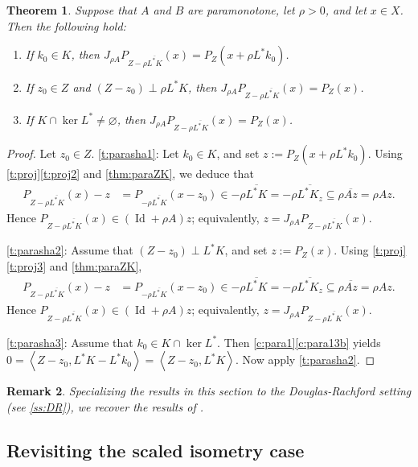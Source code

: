 \documentclass{article}
\newcommand{\scal}[2]{\left\langle{#1},{#2}  \right\rangle}
\newcommand{\Id}{\ensuremath{\operatorname{Id}}}
\newtheorem{theorem}{Theorem}[section]
\newtheorem{remark}[theorem]{Remark}
\newcommand{\cl}[1]{\overline{#1}}
\begin{document}
\begin{theorem}\label{t:parasha}
Suppose that $A$ and $B$ are paramonotone, 
let $\rho>0$, and let $x\in X$. 
Then the following hold:
\begin{enumerate}
\item
\label{t:parasha1} 
If $k_0\in K$, then 
$J_{\rho A}P_{Z-\rho \cl{L^*K}}(x)=P_Z(x+\rho L^*k_0)$. 
\item
\label{t:parasha2} 
If $z_0 \in Z$ and  $(Z-z_0)\perp \rho L^*K$, 
then 
$J_{\rho A} P_{Z-\rho \cl{L^*K}}(x)=P_Z(x)$. 
\item 
\label{t:parasha3}
If $K\cap \ker L^*\neq \varnothing$, then 
$J_{\rho A} P_{Z-\rho \cl{L^*K}}(x)=P_Z(x)$. 
\end{enumerate}
\end{theorem}

\begin{proof}
Let  $z_0\in Z$. 
\cref{t:parasha1}: 
Let $k_0\in K$, and 
set $z:=P_Z(x+\rho L^*k_0)$. 
Using \cref{t:proj}\cref{t:proj2} and \cref{thm:paraZK}, 
we deduce that 
\begin{align}
P_{Z-\rho \cl{L^*K}}(x)-z&=P_{-\rho\cl{L^*K}}(x-z_0)
\in -\rho \cl{L^*K}=-\rho\cl{L^*K_z} \subseteq \rho\cl{Az}=\rho Az.
\end{align}
Hence 
$P_{Z-\rho \cl{L^*K}}(x)\in (\Id+\rho A)z$; 
equivalently, 
$z = J_{\rho A}P_{Z-\rho \cl{L^*K}}(x)$. 

\cref{t:parasha2}:
Assume that $(Z-z_0)\perp L^*K$, and set $z:=P_Z(x)$. 
Using \cref{t:proj}\cref{t:proj3} and \cref{thm:paraZK},
\begin{align}
P_{Z-\rho \cl{L^*K}}(x)-z&=
P_{-\rho \cl{L^*K}}(x-z_0)\in -\rho\cl{L^*K}=-\rho\cl{L^* K_z}\subseteq 
\rho\cl{Az}=\rho Az.
\end{align}
Hence 
$P_{Z-\rho \cl{L^*K}}(x)\in (\Id+\rho A)z$; 
equivalently, 
$z = J_{\rho A}P_{Z-\rho \cl{L^*K}}(x)$. 

\cref{t:parasha3}:
Assume that $k_0\in K\cap\ker L^*$. 
Then \cref{c:para1}\cref{c:para13b} yields
$0=\scal{Z-z_0}{L^*K-L^*k_0}=\scal{Z-z_0}{L^*K}$. 
Now apply \cref{t:parasha2}. 
\end{proof}

\begin{remark}
Specializing the results in this section to 
the Douglas-Rachford setting (see \cref{ss:DR}), we
recover the results of \cite[Section~6]{BBHM}. 
\end{remark}


\subsection{Revisiting the scaled isometry case}
\end{document}
